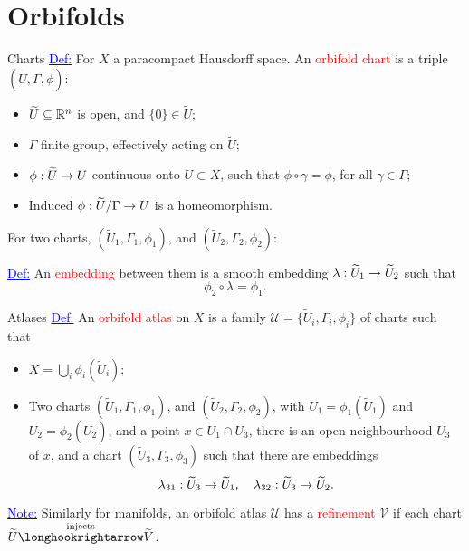 \section{Orbifolds}

\begin{frame}{Charts}
    \textcolor{blue}{\underline{Def:}} For $X$ a paracompact Hausdorff space. An \textcolor{red}{orbifold chart} is a triple $(\widetilde{U}, \Gamma, \phi)$:
        \begin{itemize}
            \item $\widetilde{U} \subseteq \mathbb{R}^{n}$ is open, and $\{0\} \in \widetilde{U}$;
            \item $\Gamma$ finite group, effectively acting on $\widetilde{U}$;
            \item $\phi : \widetilde{U} \rightarrow U$ continuous onto $U \subset X$, \newline such that $\phi \circ \gamma = \phi$, for all $\gamma \in \Gamma$;
            \item Induced $\phi : \widetilde{U}/\Gamma \rightarrow U$ is a homeomorphism.\newline
        \end{itemize}
                
        For two charts, $(\widetilde{U}_{1}, \Gamma_{1}, \phi_{1})$, and $(\widetilde{U}_{2}, \Gamma_{2}, \phi_{2})$: \newline
        
        \textcolor{blue}{\underline{Def:}} An \textcolor{red}{embedding} between them is a smooth embedding $\lambda : \widetilde{U}_{1} \rightarrow \widetilde{U}_{2}$ such that
        \[
            \phi_{2} \circ \lambda = \phi_{1}.    
        \]
\end{frame}



\begin{frame}{Atlases}
    \textcolor{blue}{\underline{Def:}} An \textcolor{red}{orbifold atlas} on $X$ is a family $\mathcal{U} = \{\widetilde{U}_{i}, \Gamma_{i}, \phi_{i}\}$ of charts such that
        \begin{itemize}
            \item $X = \bigcup_{i} \phi_{i}(\widetilde{U}_{i})$;
            \item Two charts $(\widetilde{U}_{1}, \Gamma_{1}, \phi_{1})$, and $(\widetilde{U}_{2}, \Gamma_{2}, \phi_{2})$, with $U_{1} = \phi_{1}(\widetilde{U}_{1})$ and $U_{2} = \phi_{2}(\widetilde{U}_{2})$, and a point $x \in U_{1} \cap U_{3}$, there is an open neighbourhood $U_{3}$ of $x$, and a chart $(\widetilde{U}_{3}, \Gamma_{3}, \phi_{3})$ such that there are embeddings
            \[
                \lambda_{31} : \widetilde{U}_{3} \rightarrow \widetilde{U}_{1}, \quad \lambda_{32} : \widetilde{U}_{3} \rightarrow \widetilde{U}_{2}.
            \]
        \end{itemize}
    \textcolor{blue}{\underline{Note:}} Similarly for manifolds, an orbifold atlas $\mathcal{U}$ has a \textcolor{red}{refinement} $\mathcal{V}$ if each chart $\widetilde{U} \overset{\text{injects}}{\longhookrightarrow} \widetilde{V}$.
\end{frame}

